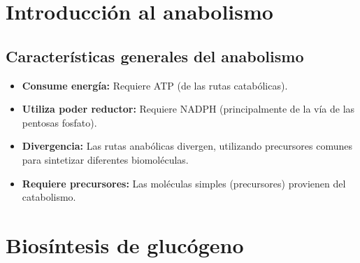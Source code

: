 
\section{Introducción al anabolismo}


\subsection{Características generales del anabolismo}
\begin{itemize}
    \item \textbf{Consume energía:} Requiere ATP (de las rutas catabólicas).
    \item \textbf{Utiliza poder reductor:} Requiere NADPH (principalmente de la vía de las pentosas fosfato).
    \item \textbf{Divergencia:} Las rutas anabólicas divergen, utilizando precursores comunes para sintetizar diferentes biomoléculas.
    \item \textbf{Requiere precursores:} Las moléculas simples (precursores) provienen del catabolismo.
\end{itemize}

\section{Biosíntesis de glucógeno}


